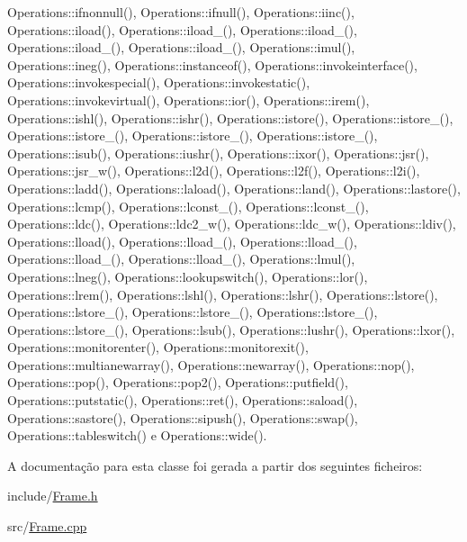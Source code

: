 Operations\+::ifnonnull(), Operations\+::ifnull(), Operations\+::iinc(), Operations\+::iload(), Operations\+::iload\+\_(), Operations\+::iload\+\_(), Operations\+::iload\+\_(), Operations\+::iload\+\_(), Operations\+::imul(), Operations\+::ineg(), Operations\+::instanceof(), Operations\+::invokeinterface(), Operations\+::invokespecial(), Operations\+::invokestatic(), Operations\+::invokevirtual(), Operations\+::ior(), Operations\+::irem(), Operations\+::ishl(), Operations\+::ishr(), Operations\+::istore(), Operations\+::istore\+\_(), Operations\+::istore\+\_(), Operations\+::istore\+\_(), Operations\+::istore\+\_(), Operations\+::isub(), Operations\+::iushr(), Operations\+::ixor(), Operations\+::jsr(), Operations\+::jsr\+\_\+w(), Operations\+::l2d(), Operations\+::l2f(), Operations\+::l2i(), Operations\+::ladd(), Operations\+::laload(), Operations\+::land(), Operations\+::lastore(), Operations\+::lcmp(), Operations\+::lconst\+\_(), Operations\+::lconst\+\_(), Operations\+::ldc(), Operations\+::ldc2\+\_\+w(), Operations\+::ldc\+\_\+w(), Operations\+::ldiv(), Operations\+::lload(), Operations\+::lload\+\_(), Operations\+::lload\+\_(), Operations\+::lload\+\_(), Operations\+::lload\+\_(), Operations\+::lmul(), Operations\+::lneg(), Operations\+::lookupswitch(), Operations\+::lor(), Operations\+::lrem(), Operations\+::lshl(), Operations\+::lshr(), Operations\+::lstore(), Operations\+::lstore\+\_(), Operations\+::lstore\+\_(), Operations\+::lstore\+\_(), Operations\+::lstore\+\_(), Operations\+::lsub(), Operations\+::lushr(), Operations\+::lxor(), Operations\+::monitorenter(), Operations\+::monitorexit(), Operations\+::multianewarray(), Operations\+::newarray(), Operations\+::nop(), Operations\+::pop(), Operations\+::pop2(), Operations\+::putfield(), Operations\+::putstatic(), Operations\+::ret(), Operations\+::saload(), Operations\+::sastore(), Operations\+::sipush(), Operations\+::swap(), Operations\+::tableswitch() e Operations\+::wide().



A documentação para esta classe foi gerada a partir dos seguintes ficheiros\+:\begin{DoxyCompactItemize}
\item 
include/\hyperlink{Frame_8h}{Frame.\+h}\item 
src/\hyperlink{Frame_8cpp}{Frame.\+cpp}\end{DoxyCompactItemize}
